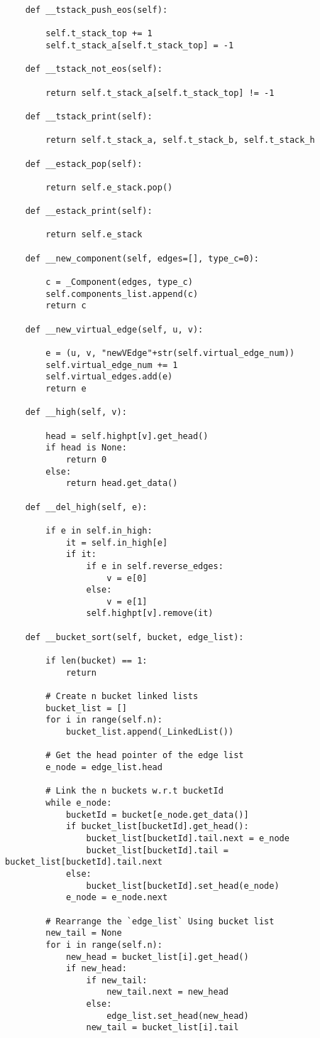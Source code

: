 \begin{center}
\begin{verbatim}
	def __tstack_push_eos(self):

		self.t_stack_top += 1
		self.t_stack_a[self.t_stack_top] = -1

	def __tstack_not_eos(self):

		return self.t_stack_a[self.t_stack_top] != -1

	def __tstack_print(self):

		return self.t_stack_a, self.t_stack_b, self.t_stack_h

	def __estack_pop(self):

		return self.e_stack.pop()

	def __estack_print(self):

		return self.e_stack

	def __new_component(self, edges=[], type_c=0):

		c = _Component(edges, type_c)
		self.components_list.append(c)
		return c

	def __new_virtual_edge(self, u, v):

		e = (u, v, "newVEdge"+str(self.virtual_edge_num))
		self.virtual_edge_num += 1
		self.virtual_edges.add(e)
		return e

	def __high(self, v):

		head = self.highpt[v].get_head()
		if head is None:
			return 0
		else:
			return head.get_data()

	def __del_high(self, e):

		if e in self.in_high:
			it = self.in_high[e]
			if it:
				if e in self.reverse_edges:
					v = e[0]
				else:
					v = e[1]
				self.highpt[v].remove(it)

	def __bucket_sort(self, bucket, edge_list):

		if len(bucket) == 1:
			return

		# Create n bucket linked lists
		bucket_list = []
		for i in range(self.n):
			bucket_list.append(_LinkedList())

		# Get the head pointer of the edge list
		e_node = edge_list.head

		# Link the n buckets w.r.t bucketId
		while e_node:
			bucketId = bucket[e_node.get_data()]
			if bucket_list[bucketId].get_head():
				bucket_list[bucketId].tail.next = e_node
				bucket_list[bucketId].tail = bucket_list[bucketId].tail.next
			else:
				bucket_list[bucketId].set_head(e_node)
			e_node = e_node.next

		# Rearrange the `edge_list` Using bucket list
		new_tail = None
		for i in range(self.n):
			new_head = bucket_list[i].get_head()
			if new_head:
				if new_tail:
					new_tail.next = new_head
				else:
					edge_list.set_head(new_head)
				new_tail = bucket_list[i].tail


\end{verbatim}
\end{center}
